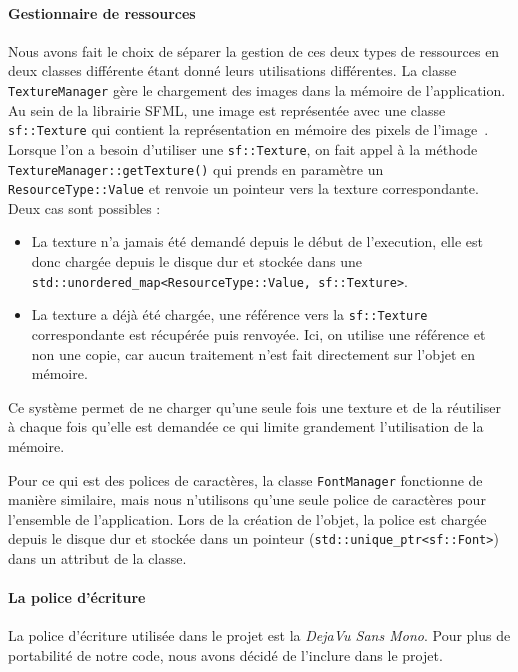 \paragraph{Gestionnaire de ressources}
Nous avons fait le choix de séparer la gestion de ces deux types de ressources en deux classes différente étant donné leurs utilisations différentes.
La classe \texttt{TextureManager} gère le chargement des images dans la mémoire de l'application.
Au sein de la librairie SFML, une image est représentée avec une classe \texttt{sf::Texture} qui contient la représentation en mémoire des pixels de l'image~\cite{sfml_sf_texture}.
Lorsque l'on a besoin d'utiliser une \texttt{sf::Texture}, on fait appel à la méthode \texttt{TextureManager::getTexture()} qui prends en paramètre un \texttt{ResourceType::Value} et renvoie un pointeur vers la texture correspondante.
Deux cas sont possibles :
\begin{itemize}
    \item La texture n'a jamais été demandé depuis le début de l'execution, elle est donc chargée depuis le disque dur et stockée dans une \texttt{std::unordered\_map<ResourceType::Value, sf::Texture>}.
    \item La texture a déjà été chargée, une référence vers la \texttt{sf::Texture} correspondante est récupérée puis renvoyée.
    Ici, on utilise une référence et non une copie, car aucun traitement n'est fait directement sur l'objet en mémoire.
\end{itemize}
Ce système permet de ne charger qu'une seule fois une texture et de la réutiliser à chaque fois qu'elle est demandée ce qui limite grandement l'utilisation de la mémoire.

Pour ce qui est des polices de caractères, la classe \texttt{FontManager} fonctionne de manière similaire, mais nous n'utilisons qu'une seule police de caractères pour l'ensemble de l'application.
Lors de la création de l'objet, la police est chargée depuis le disque dur et stockée dans un pointeur (\texttt{std::unique\_ptr<sf::Font>}) dans un attribut de la classe.

\paragraph{La police d'écriture}
La police d'écriture utilisée dans le projet est la \textit{DejaVu Sans Mono}.
Pour plus de portabilité de notre code, nous avons décidé de l'inclure dans le projet.

